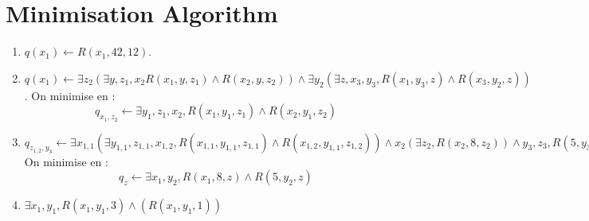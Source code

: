 \documentclass{cours}
\begin{document}
\section{Minimisation Algorithm}
\begin{enumerate}
    \item $q(x_{1}) \gets R(x_{1}, 42, 12)$.
    \item $q(x_{1}) \gets \exists z_{2} \left(\exists y, z_{1}, x_{2} R(x_{1}, y, z_{1}) \land R(x_{2}, y, z_{2})\right) \land \exists y_{2} \left(\exists z, x_{3}, y_{3}, R(x_{1}, y_{3}, z) \land R(x_{3}, y_{2}, z)\right)$. On minimise en : 
    \[
        q_{x_{1}, z_{2}} \gets \exists y_{1}, z_{1}, x_{2}, R(x_{1}, y_{1}, z_{1}) \land R(x_{2}, y_{1}, z_{2})
    \]
    \item $q_{z_{1,2}, y_{3}} \gets 
    \exists x_{1,1} \left(\exists y_{1,1}, z_{1,1}, x_{1,2}, R(x_{1,1}, y_{1,1}, z_{1,1}) \land R(x_{1, 2}, y_{1,1}, z_{1,2})\right) 
    \land x_{2} \left(\exists z_{2}, R(x_{2}, 8, z_{2})\right) 
    \land y_{3}, z_{3}, R(5, y_{3}, z_{3})$
    On minimise en : 
    \[
        q_{z} \gets \exists x_{1}, y_{2}, R(x_{1}, 8, z) \land R(5, y_{2}, z)
    \]
    \item $\exists x_{1}, y_{1}, R(x_{1}, y_{1}, 3) \land \left(R(x_{1}, y_{1}, 1)\right)$
\end{enumerate}

\end{document}

